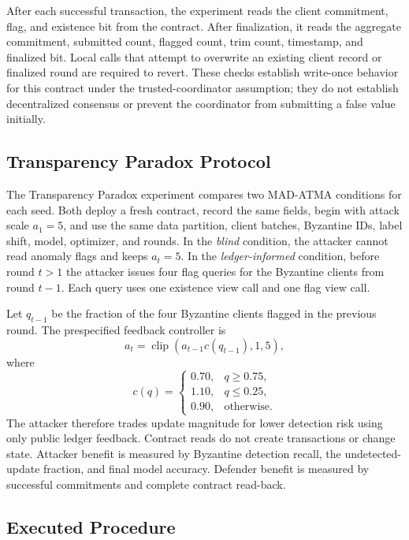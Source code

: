 \documentclass[10pt,letterpaper]{article}
\begin{document}
After each successful transaction, the experiment reads the client commitment,
flag, and existence bit from the contract. After finalization, it reads the
aggregate commitment, submitted count, flagged count, trim count, timestamp,
and finalized bit. Local calls that attempt to overwrite an existing client
record or finalized round are required to revert. These checks establish
write-once behavior for this contract under the trusted-coordinator assumption;
they do not establish decentralized consensus or prevent the coordinator from
submitting a false value initially.

\subsection{Transparency Paradox Protocol}

The Transparency Paradox experiment compares two MAD-ATMA conditions for each
seed. Both deploy a fresh contract, record the same fields, begin with attack
scale $a_1=5$, and use the same data partition, client batches, Byzantine IDs,
label shift, model, optimizer, and rounds. In the \emph{blind} condition, the
attacker cannot read anomaly flags and keeps $a_t=5$. In the
\emph{ledger-informed} condition, before round $t>1$ the attacker issues four
flag queries for the Byzantine clients from round $t-1$. Each query uses one
existence view call and one flag view call.

Let $q_{t-1}$ be the fraction of the four Byzantine clients flagged in the
previous round. The prespecified feedback controller is
\begin{equation}
a_t=\operatorname{clip}
\left(a_{t-1}c(q_{t-1}),1,5\right),
\end{equation}
where
\begin{equation}
c(q)=
\begin{cases}
0.70, & q\geq0.75,\\
1.10, & q\leq0.25,\\
0.90, & \text{otherwise}.
\end{cases}
\end{equation}
The attacker therefore trades update magnitude for lower detection risk using
only public ledger feedback. Contract reads do not create transactions or change
state. Attacker benefit is measured by Byzantine detection recall, the
undetected-update fraction, and final model accuracy. Defender benefit is
measured by successful commitments and complete contract read-back.

\subsection{Executed Procedure}
\end{document}
